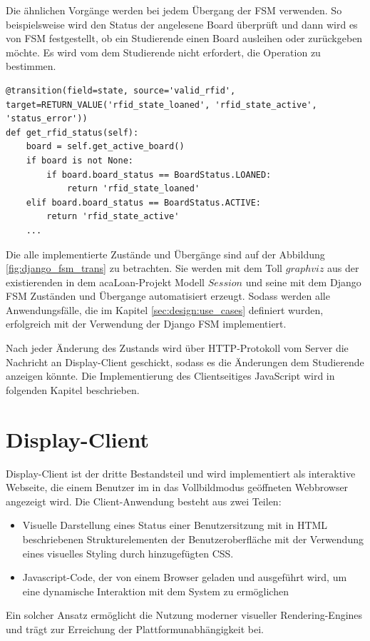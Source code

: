 Die ähnlichen Vorgänge werden bei jedem Übergang der FSM verwenden. So beispielsweise wird den Status der angelesene Board überprüft und dann wird es von FSM festgestellt, ob ein Studierende einen Board ausleihen oder zurückgeben möchte. Es wird vom dem Studierende nicht erfordert, die Operation zu bestimmen. 

\begin{lstlisting}[caption={FSM Übergang beim Ablesen der Board RFID-Tag},captionpos=b]
@transition(field=state, source='valid_rfid',
target=RETURN_VALUE('rfid_state_loaned', 'rfid_state_active', 'status_error'))
def get_rfid_status(self):
	board = self.get_active_board()
	if board is not None:
		if board.board_status == BoardStatus.LOANED:
			return 'rfid_state_loaned'
	elif board.board_status == BoardStatus.ACTIVE:
		return 'rfid_state_active'
	...
\end{lstlisting}

Die alle implementierte Zustände und Übergänge sind auf der Abbildung \ref{fig:django_fsm_trans} zu betrachten. Sie werden mit dem Toll $graphviz$ aus der existierenden in dem acaLoan-Projekt Modell $Session$ und seine mit dem Django FSM Zuständen und Übergange automatisiert erzeugt. Sodass werden alle Anwendungsfälle, die im Kapitel \ref{sec:design:use_cases} definiert wurden, erfolgreich mit der Verwendung der Django FSM implementiert. 

Nach jeder Änderung des Zustands wird über HTTP-Protokoll vom Server die Nachricht an Display-Client geschickt, sodass es die Änderungen dem Studierende anzeigen könnte. Die Implementierung des Clientseitiges JavaScript wird in folgenden Kapitel beschrieben.  

\section{Display-Client}
\label{sec:display_client}
Display-Client ist der dritte Bestandsteil und wird implementiert als interaktive Webseite, die einem Benutzer im in das Vollbildmodus geöffneten Webbrowser angezeigt wird. Die Client-Anwendung besteht aus zwei Teilen: 
\begin{itemize}
	\item Visuelle Darstellung eines Status einer Benutzersitzung mit in HTML beschriebenen Strukturelementen der Benutzeroberfläche mit der Verwendung eines visuelles Styling durch hinzugefügten CSS.
	\item Javascript-Code, der von einem Browser geladen und ausgeführt wird, um eine dynamische Interaktion mit dem System zu ermöglichen
\end{itemize}
Ein solcher Ansatz ermöglicht die Nutzung moderner visueller Rendering-Engines und trägt zur Erreichung der Plattformunabhängigkeit bei. 


